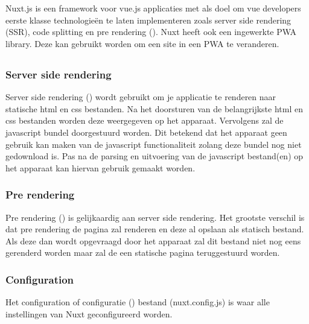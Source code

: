 \chapter{}
\label{ch:nuxt}
Nuxt.js is een framework voor vue.js applicaties met als doel om vue developers eerste klasse technologieën te laten implementeren zoals server side rendering (SSR), code splitting en pre rendering (\cite{NUXTJS}). Nuxt heeft ook een ingewerkte PWA library. Deze kan gebruikt worden om een site in een PWA te veranderen. 

\section{}
\label{sec:basisprincipes}

\subsection{Server side rendering}
Server side rendering (\cite{NUXT_SERVERSIDERENDERING}) wordt gebruikt om je applicatie te renderen naar statische html en css bestanden. Na het doorsturen van de belangrijkste html en css bestanden worden deze weergegeven op het apparaat. Vervolgens zal de javascript bundel doorgestuurd worden. Dit betekend dat het apparaat geen gebruik kan maken van de javascript functionaliteit zolang deze bundel nog niet gedownload is. Pas na de parsing en uitvoering van de javascript bestand(en) op het apparaat kan hiervan gebruik gemaakt worden.

\subsection{Pre rendering}
Pre rendering (\cite{NUXT_PRERENDERING}) is gelijkaardig aan server side rendering. Het grootste verschil is dat pre rendering de pagina zal renderen en deze al opslaan als statisch bestand. Als deze dan wordt opgevraagd door het apparaat zal dit bestand niet nog eens gerenderd worden maar zal de een statische pagina teruggestuurd worden.

\subsection{Configuration}
Het configuration of configuratie (\cite{NUXT_CONFIGURATION}) bestand (nuxt.config.js) is waar alle instellingen van Nuxt geconfigureerd worden.

